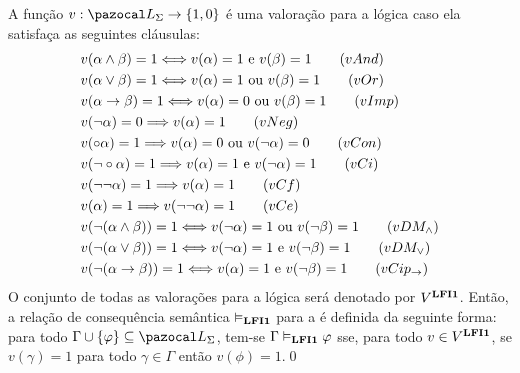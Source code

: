         \begin{definicao} \label{def:valoracoes}
            A função $v : \ling{} \to \{1, 0\}$ é uma valoração para a lógica \lfium{} caso ela satisfaça as seguintes cláusulas:
            \begin{align*}
                & v(\alpha \land \beta) = 1 \Longleftrightarrow v(\alpha) = 1 \text{ e } v(\beta) = 1\tag{\textbf{$vAnd$}}\\
                & v(\alpha \lor \beta) = 1 \Longleftrightarrow v(\alpha) = 1 \text{ ou } v(\beta) = 1\tag{\textbf{$vOr$}}\\
                & v(\alpha \to \beta) = 1 \Longleftrightarrow v(\alpha) = 0 \text{ ou } v(\beta) = 1\tag{\textbf{$vImp$}}\\
                & v(\neg \alpha) = 0 \Longrightarrow v(\alpha) = 1\tag{\textbf{$vNeg$}}\\
                & v(\circ \alpha) = 1 \Longrightarrow v(\alpha) = 0 \text{ ou } v(\neg \alpha) = 0\tag{\textbf{$vCon$}}\\
                & v(\neg \circ \alpha) = 1 \Longrightarrow v(\alpha) = 1 \text{ e } v(\neg \alpha) = 1\tag{\textbf{$vCi$}}\\
                & v(\neg \neg \alpha) = 1 \Longrightarrow v(\alpha) = 1\tag{\textbf{$vCf$}}\\
                & v(\alpha) = 1 \Longrightarrow v(\neg \neg \alpha) = 1\tag{\textbf{$vCe$}}\\
                & v(\neg (\alpha \land \beta)) = 1 \Longleftrightarrow v(\neg \alpha) = 1 \text{ ou } v(\neg \beta) = 1\tag{\textbf{$vDM_{\land}$}}\\
                & v(\neg (\alpha \lor \beta)) = 1 \Longleftrightarrow v(\neg \alpha) = 1 \text{ e } v(\neg \beta) = 1\tag{\textbf{$vDM_{\lor}$}}\\
                & v(\neg (\alpha \to \beta)) = 1 \Longleftrightarrow v(\alpha) = 1 \text{ e } v(\neg \beta) = 1\tag{\textbf{$vCip_{\to}$}}
            \end{align*}
            O conjunto de todas as valorações para a lógica \lfium{} será denotado por $V^{{\normalfont\textbf{LFI1}}{}}$. Então, a relação de consequência semântica $\vDash_{{\normalfont\textbf{LFI1}}{}}$ para a \lfium{} é definida da seguinte forma: para todo $\Gamma \cup \{\phi\} \subseteq \ling{}$, tem-se $\Gamma \vDash_{{\normalfont\textbf{LFI1}}{}} \varphi$ sse, para todo $v \in V^{{\normalfont\textbf{LFI1}}{}}$, se $v(\gamma) = 1$ para todo $\gamma \in \Gamma$ então $v(\phi) = 1$.\qed{}
        \end{definicao}
         

